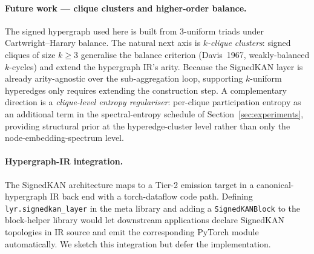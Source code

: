 \paragraph{Future work — clique clusters and higher-order balance.}
The signed hypergraph used here is built from $3$-uniform triads
under Cartwright--Harary balance. The natural next axis is
\emph{$k$-clique clusters}: signed cliques of size $k\!\geq\!3$
generalise the balance criterion (Davis~1967, weakly-balanced
$k$-cycles) and extend the hypergraph IR's arity. Because the
SignedKAN layer is already arity-agnostic over the sub-aggregation
loop, supporting $k$-uniform hyperedges only requires extending the
construction step. A complementary direction is a \emph{clique-level
entropy regulariser}: per-clique participation entropy as an
additional term in the spectral-entropy schedule of
Section~\ref{sec:experiments}, providing structural prior at the
hyperedge-cluster level rather than only the
node-embedding-spectrum level.

\paragraph{Hypergraph-IR integration.}
The SignedKAN architecture maps to a Tier-2 emission target in a
canonical-hypergraph IR back end with a torch-dataflow code path.
Defining \texttt{lyr.signedkan\_layer} in the meta library and
adding a \texttt{SignedKANBlock} to the block-helper library would
let downstream applications declare SignedKAN topologies in IR
source and emit the corresponding PyTorch module automatically.
We sketch this integration but defer the implementation.